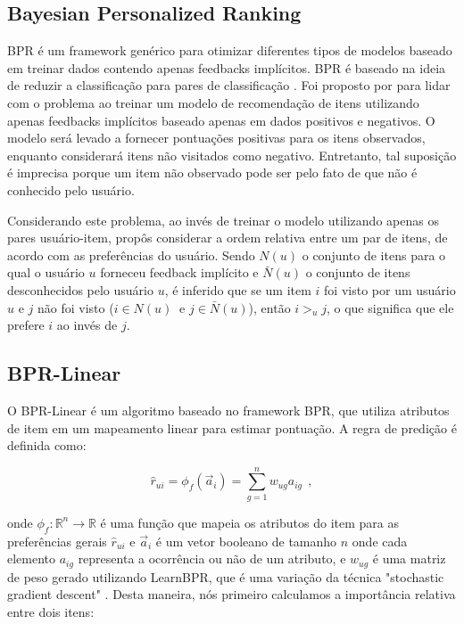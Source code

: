 \subsection{Bayesian Personalized Ranking}

\ac{BPR} é um framework genérico para otimizar diferentes tipos de modelos baseado em treinar dados contendo apenas feedbacks implícitos. \ac{BPR} é baseado na ideia de reduzir a classificação para pares de classificação \citep{balcan2008}. Foi proposto por \citep{Rendle:2009:BBP:1795114.1795167} para lidar com o problema ao treinar um modelo de recomendação de itens utilizando apenas feedbacks implícitos baseado apenas em dados positivos e negativos. O modelo será levado a fornecer pontuações positivas para os itens observados, enquanto considerará itens não visitados como negativo. Entretanto, tal suposição é imprecisa porque um item não observado pode ser pelo fato de que não é conhecido pelo usuário.

Considerando este problema, ao invés de treinar o modelo utilizando apenas os pares usuário-item, \cite{Rendle:2009:BBP:1795114.1795167} propôs considerar a ordem relativa entre um par de itens, de acordo com as preferências do usuário. Sendo $N(u)$ o conjunto de itens para o qual o usuário $u$ forneceu feedback implícito e $\bar{N}(u)$ o conjunto de itens desconhecidos pelo usuário $u$, é inferido que se um item $i$ foi visto por um usuário $u$ e $j$ não foi visto ($i \in N(u)~$ e $j \in \bar{N}(u)$), então $i >_{u} j$, o que significa que ele prefere $i$ ao invés de $j$.


\subsection{BPR-Linear}
\label{sec:bpr-linear}
O BPR-Linear \citep{gantner2010} é um algoritmo baseado no framework \ac{BPR}, que utiliza atributos de item em um mapeamento linear para estimar pontuação. A regra de predição é definida como:

\begin{equation}
\hat{r}_{ui} = \phi_f(\vec{a}_i) = \displaystyle\sum_{g=1}^{n} w_{ug} a_{ig}~~,
\label{eq:bpr-linear}
\end{equation}

\noindent onde $\phi_f : \mathbb{R}^n \rightarrow \mathbb{R}$ é uma função que mapeia os atributos do item para as preferências gerais $\hat{r}_{ui}$ e $\vec{a}_i$ é um vetor booleano de tamanho $n$ onde cada elemento $a_{ig}$ representa a ocorrência ou não de um atributo, e $w_{ug}$ é uma matriz de peso gerado utilizando LearnBPR, que é uma variação da técnica "stochastic gradient descent" \cite{gantner2011}. Desta maneira, nós primeiro calculamos a importância relativa entre dois itens:

